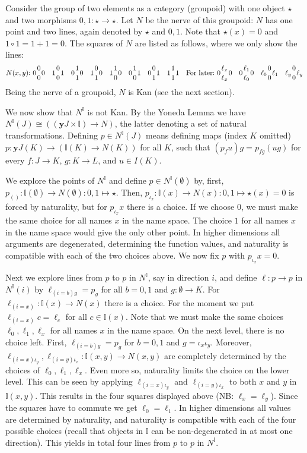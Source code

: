 \documentclass[10pt,a4paper]{article}
\newcommand{\es}{\emptyset}
\newcommand{\yoneda}{\mathbf{y}}
\newcommand{\interval}{\mathbb{I}}
\begin{document}
Consider the group of two elements as a category (groupoid) with one
object $\star$ and two morphisms $0,1:\star\to\star$.  Let $N$ be the
nerve of this groupoid: $N$ has one point and two lines, again denoted
by $\star$ and $0,1$.  Note that $\star(x) = 0$ and $1\circ 1 =
1+1=0$.  The squares of $N$ are listed as follows, where we only show
the lines:
\[
\def\ol{{1 \atop 0}}
\def\oo{{0 \atop 0}}
\def\lo{{0 \atop 1}}
\def\ll{{1 \atop 1}}
N(x,y){:}~
0\oo0 \quad 1\oo1 \quad 0\ll0 \quad 1\lo0 \quad 1\ol0 \quad 0\ol1 \quad 0\lo1 \quad 1\ll1
\quad\mbox{For later:}~0{\ell_x \atop \ell_x}0 \quad 0{\ell_1 \atop \ell_0}0
\quad \ell_0{0 \atop 0}\ell_1 \quad \ell_y{0 \atop 0}\ell_y\]
Being the nerve of a groupoid, $N$ is Kan (see the next section).

We now show that $N^\interval$ is not Kan. By the Yoneda Lemma we have
$N^\interval(J)\cong ((\yoneda J \times \interval) \to N)$, the latter
denoting a set of natural transformations.  Defining $p\in
N^\interval(J)$ means defining maps (index $K$ omitted) $p :\yoneda J
(K) \to (\interval(K) \to N(K))$ for all $K$, such that $(p_f u) g =
p_{fg}(ug)$ for every $f:J\to K$, $g:K\to L$, and $u\in I(K)$.

We explore the points of $N^\interval$ and define $p\in
N^\interval(\emptyset)$ by, first, $p_{()}:\interval(\emptyset)\to
N(\emptyset): 0,1 \mapsto\star$.  Then, $p_{\iota_x}:\interval(x)\to N(x):
0,1 \mapsto\star(x)=0$ is forced by naturality, but for $p_{\iota_x} x$
there is a choice. If we choose $0$, we must make the same choice for
all names $x$ in the name space.  The choice $1$ for all names $x$ in
the name space would give the only other point. In higher dimensions
all arguments are degenerated, determining the function values, and
naturality is compatible with each of the two choices above. We now
fix $p$ with $p_{\iota_x} x = 0$.

Next we explore lines from $p$ to $p$ in $N^\interval$, say in
direction $i$, and define $\ell:p\to p$ in $N^\interval(i)$ by
$\ell_{(i=b)g} = p_g$ for all $b=0,1$ and $g:\es\to K$.  For
$\ell_{(i=x)}: \interval(x)\to N(x)$ there is a choice. For the moment
we put $\ell_{(i=x)} c = \ell_c$ for all $c\in \interval(x)$. Note
that we must make the same choices $\ell_0,\ell_1,\ell_x$ for all
names $x$ in the name space.  On the next level, there is no choice
left.  First, $\ell_{(i=b)g} = p_g$ for $b=0,1$ and
$g=\iota_x\iota_y$.  Moreover,
$\ell_{(i=x)\iota_y},\ell_{(i=y)\iota_x}: \interval(x,y)\to N(x,y)$
are completely determined by the choices of $\ell_0,\ell_1,\ell_x$.
Even more so, naturality limits the choice on the lower level.  This
can be seen by applying $\ell_{(i=x)\iota_y}$ and
$\ell_{(i=y)\iota_x}$ to both $x$ and $y$ in $\interval(x,y)$. This
results in the four squares displayed above (NB: $\ell_x=\ell_y$).
Since the squares have to commute we get $\ell_0 = \ell_1$.  In higher
dimensions all values are determined by naturality, and naturality is
compatible with each of the four possible choices (recall that objects
in $\interval$ can be non-degenerated in at most one direction).  This
yields in total four lines from $p$ to $p$ in $N^\interval$.
\end{document}
